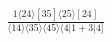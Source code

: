 \documentclass[varwidth, border=5pt]{standalone}
\begin{document}
\begin{my}
$\begin{gathered}
\scriptscriptstyle\frac{1⟨24⟩[35]⟨25⟩[24]}{⟨14⟩⟨35⟩⟨45⟩⟨4|1+3|4]}
\end{gathered}$
\end{my}
\end{document}
